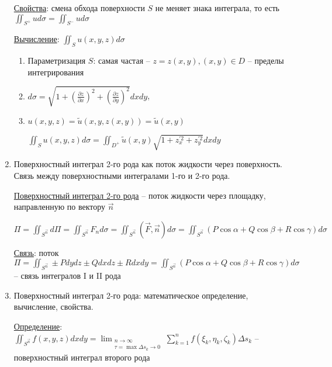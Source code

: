 \documentclass[12pt]{article}
\begin{document}
\begin{enumerate}
        \hyperlink{surfaceintegraloffirstkindproperties}{Свойства}: смена обхода поверхности $S$ не меняет знака интеграла, то есть $\iint_{S^+} u d\sigma = \iint_{S^-} u d\sigma$

        \hyperlink{surfaceintegraloffirstkindcalculation}{Вычисление}: $\iint_S u(x, y, z) d\sigma$

        \begin{enumerate}
            \item Параметризация $S$: самая частая -- $z = z(x, y), (x, y) \in D$ -- пределы интегрирования

            \item $d\sigma = \sqrt{1 + \left(\frac{\partial z}{\partial x}\right)^2 + \left(\frac{\partial z}{\partial y}\right)^2} dxdy$,

            \item $u(x, y, z) = \tilde{u}(x, y, z(x, y)) = \tilde{u}(x, y)$

            $\iint_S u(x, y, z) d\sigma = \iint_{D^+} \tilde{u}(x, y) \sqrt{1 + z_x^{\prime 2} + z_y^{\prime 2}} dxdy$
        \end{enumerate}


        \item Поверхностный интеграл 2-го рода как поток жидкости через поверхность. Связь между поверхностными интегралами 1-го и 2-го рода.

        \hyperlink{surfaceintegralofsecondkind}{Поверхностный интеграл 2-го рода} -- поток жидкости через площадку, направленную по вектору $\vec{n}$

        $\Pi = \iint_{S^{\vec{n}}} d\Pi = \iint_{S^{\vec{n}}} F_n d\sigma = \iint_{S^{\vec{n}}} (\vec{F}, \vec{n})d\sigma = \iint_{S^{\vec{n}}} (P\cos\alpha + Q\cos\beta + R\cos\gamma)d\sigma$

        \hyperlink{connectionbetweensurfaceintegral}{Связь}: поток $\Pi = \iint_{S^{\vec{n}}} \pm Pdydz \pm Qdxdz \pm Rdxdy = \iint_{S^{\vec{n}}} (P\cos\alpha + Q\cos\beta + R\cos\gamma) d\sigma$ -- связь интегралов I и II рода

        \item Поверхностный интеграл 2-го рода: математическое определение, вычисление, свойства.

        \hyperlink{surfaceintegralofsecondkindmath}{Определение}: $\iint_{S^{\vec{n}}} f(x, y, z) dxdy = \lim_{\substack{n \to \infty \\ \tau = \max \Delta s_k \to 0}} \sum_{k=1}^n f(\xi_k, \eta_k, \zeta_k) \Delta s_k$ -- поверхностный интеграл второго рода


\end{enumerate}
\end{document}
